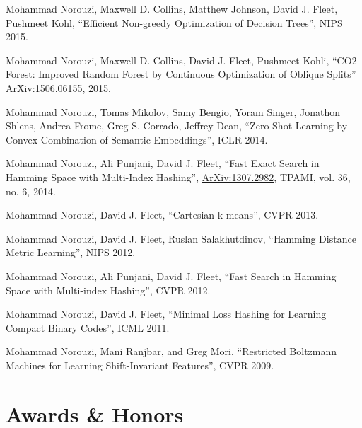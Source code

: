 \documentclass[10pt,letterpaper]{article}
\renewenvironment{itemize}{
  \begin{list}{}{
    \setlength{\leftmargin}{1.5em}
  }
}{
  \end{list}
}
\begin{document}
\begin{itemize}
\item
Mohammad Norouzi, Maxwell D. Collins, Matthew Johnson, David J. Fleet, Pushmeet Kohl,
``Efficient Non-greedy Optimization of Decision Trees'', NIPS 2015.
\item
Mohammad Norouzi, Maxwell D. Collins, David J. Fleet, Pushmeet Kohli,
``CO2 Forest: Improved Random Forest by Continuous Optimization of Oblique Splits''
\href{https://arxiv.org/pdf/1506.06155}{ArXiv:1506.06155}, 2015.
\item
Mohammad Norouzi, Tomas Mikolov, Samy Bengio, Yoram Singer, Jonathon Shlens, Andrea Frome, Greg S. Corrado, Jeffrey Dean,
``Zero-Shot Learning by Convex Combination of Semantic Embeddings'', ICLR 2014.
\item
Mohammad Norouzi, Ali Punjani, David J. Fleet, ``Fast Exact Search in Hamming Space with Multi-Index Hashing'',
\href{https://arxiv.org/pdf/1307.2982}{ArXiv:1307.2982}, TPAMI, vol. 36, no. 6, 2014.
\item
  Mohammad Norouzi, David J. Fleet, ``Cartesian k-means'', CVPR 2013.
\item
  Mohammad Norouzi, David J. Fleet, Ruslan Salakhutdinov, ``Hamming Distance Metric Learning'', NIPS 2012.
\item
  Mohammad Norouzi, Ali Punjani, David J. Fleet, ``Fast Search in Hamming Space with Multi-index Hashing'', CVPR 2012.
\item 
  Mohammad Norouzi, David J. Fleet, ``Minimal Loss Hashing for Learning Compact Binary Codes'', ICML 2011.
\item 
  Mohammad Norouzi, Mani Ranjbar, and Greg Mori, ``Restricted Boltzmann Machines for Learning Shift-Invariant Features'', CVPR 2009.
\end{itemize}

\section*{Awards \& Honors}
\end{document}
